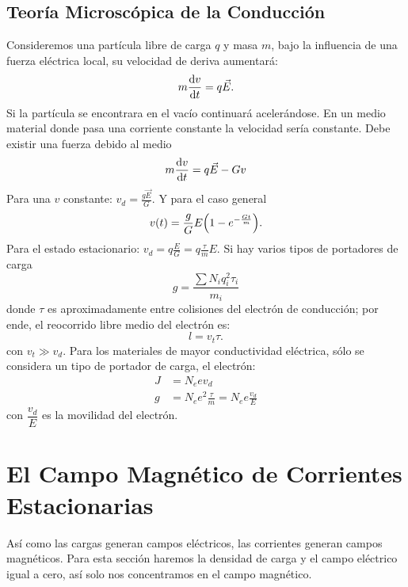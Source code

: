 \section{Teoría Microscópica de la Conducción}
Consideremos una partícula libre de carga $q$ y masa $m$, bajo la influencia de una fuerza eléctrica local, su velocidad de deriva aumentará:
\begin{equation}
    m\dv{v}{t} = q\vec{E}.
\end{equation}
Si la partícula se encontrara en el vacío continuará acelerándose. En un medio material donde pasa una corriente constante la velocidad sería constante. Debe existir una fuerza debido al medio
\begin{equation}
    m\dv{v}{t} = q\vec{E} - Gv
\end{equation}
Para una $v$ constante: $v_d = \frac{g\vec{E}}{G}$. Y para el caso general
\begin{equation}
    v(t) = \frac{g}{G} E \qty(1 - e^{-\frac{Gt}{m}}).
\end{equation}
Para el estado estacionario: $v_d = q\frac{E}{G} = q\frac{\tau}{m} E$. Si hay varios tipos de portadores de carga
\begin{equation}
    g = \frac{\sum N_i q_i ^2 \tau _i}{m_i}
\end{equation}
donde $\tau$ es aproximadamente entre colisiones del electrón de conducción; por ende, el reocorrido libre medio del electrón es:
\begin{equation}
    l = v_t \tau.
\end{equation}
con $v_t \gg v_d$. Para los materiales de mayor conductividad eléctrica, sólo se considera un tipo de portador de carga, el electrón:
\begin{align*}
    J &= N_e e v_d \\
    g &= N_e e^2 \frac{\tau}{m} = N_e e \frac{v_d}{E}
\end{align*}
con $\dfrac{v_d}{E}$ es la movilidad del electrón.




\chapter{El Campo Magnético de Corrientes Estacionarias}
Así como las cargas generan campos eléctricos, las corrientes generan campos magnéticos. Para esta sección haremos la densidad de carga y el campo eléctrico igual a cero, así solo nos concentramos en el campo magnético.

